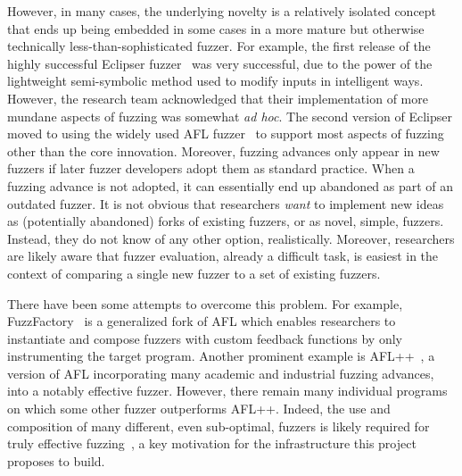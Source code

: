 However, in many cases,
the underlying novelty is a relatively isolated concept that ends up being 
embedded in some cases in a more mature but otherwise technically
less-than-sophisticated fuzzer.  For example, 
the first release of the highly successful Eclipser fuzzer~\cite{Eclipser} was very successful, 
due to the power of the lightweight semi-symbolic method used to modify 
inputs in intelligent ways.  However, the research team acknowledged that their 
implementation of more mundane aspects of fuzzing was somewhat \emph{ad hoc}.  The 
second version of Eclipser moved to using the widely used AFL fuzzer~\cite{aflfuzz} to support 
most aspects of fuzzing other than the core innovation.  
%
Moreover, fuzzing advances only appear in new fuzzers 
if later fuzzer developers adopt them as standard practice. When a 
fuzzing advance is not adopted, it can
essentially end up abandoned as part of an outdated fuzzer.   It is
not obvious that researchers \emph{want} to implement new ideas as
(potentially abandoned) forks of existing fuzzers, or as novel,
simple, fuzzers.  Instead, they do not know of any other option,
realistically.  Moreover, researchers are likely aware that fuzzer
evaluation, already a difficult task, is easiest in the context of
comparing a single new fuzzer to a set of existing fuzzers.

There have been some attempts to overcome this problem. For example, 
FuzzFactory~\cite{fuzzfactory} is a generalized fork of AFL which enables researchers 
to instantiate and compose fuzzers with custom feedback functions by only 
instrumenting the target program. Another prominent example is AFL++~\cite{AFLplusplus}, a 
version of AFL incorporating many academic and industrial fuzzing advances, 
into a notably effective fuzzer.  However, there remain many individual 
programs on which some other fuzzer outperforms AFL++. Indeed, the use and
composition of 
many different, even sub-optimal, fuzzers is likely required for truly 
effective fuzzing~\cite{chen2019enfuzz,UsesDiversity,ensemble,pastis}, a key
motivation for the infrastructure this project proposes to build.

